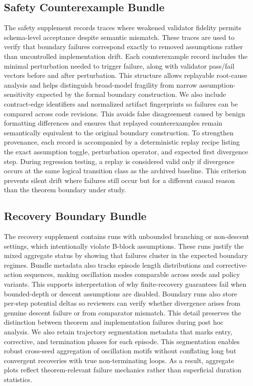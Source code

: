 \documentclass{article} %
\begin{document}
\subsection{Safety Counterexample Bundle}
\label{app:safety_bundle}
The safety supplement records traces where weakened validator fidelity permits schema-level acceptance despite semantic mismatch. These traces are used to verify that boundary failures correspond exactly to removed assumptions rather than uncontrolled implementation drift.
Each counterexample record includes the minimal perturbation needed to trigger failure, along with validator pass/fail vectors before and after perturbation. This structure allows replayable root-cause analysis and helps distinguish broad-model fragility from narrow assumption-sensitivity expected by the formal boundary construction.
We also include contract-edge identifiers and normalized artifact fingerprints so failures can be compared across code revisions. This avoids false disagreement caused by benign formatting differences and ensures that replayed counterexamples remain semantically equivalent to the original boundary construction.
To strengthen provenance, each record is accompanied by a deterministic replay recipe listing the exact assumption toggle, perturbation operator, and expected first divergence step. During regression testing, a replay is considered valid only if divergence occurs at the same logical transition class as the archived baseline. This criterion prevents silent drift where failures still occur but for a different causal reason than the theorem boundary under study.

\subsection{Recovery Boundary Bundle}
\label{app:recovery_bundle}
The recovery supplement contains runs with unbounded branching or non-descent settings, which intentionally violate B-block assumptions. These runs justify the mixed aggregate status by showing that failures cluster in the expected boundary regimes.
Bundle metadata also tracks episode length distributions and corrective-action sequences, making oscillation modes comparable across seeds and policy variants. This supports interpretation of why finite-recovery guarantees fail when bounded-depth or descent assumptions are disabled.
Boundary runs also store per-step potential deltas so reviewers can verify whether divergence arises from genuine descent failure or from comparator mismatch. This detail preserves the distinction between theorem and implementation failures during post hoc analysis.
We also retain trajectory segmentation metadata that marks entry, corrective, and termination phases for each episode. This segmentation enables robust cross-seed aggregation of oscillation motifs without conflating long but convergent recoveries with true non-terminating loops. As a result, aggregate plots reflect theorem-relevant failure mechanics rather than superficial duration statistics.
\end{document}
